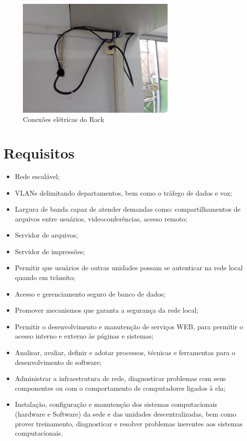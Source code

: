 \documentclass[	DIV=calc,%
							paper=a4,%
							fontsize=12pt,%
							onecolumn]{scrartcl}	 					%
\begin{document}
\begin{figure}[h!]
	\centering
	\includegraphics[width=0.7\textwidth]{figura13.jpg}
	\caption[Conexões elétricas do Rack]{Conexões elétricas do Rack}
	\label{figura13}
\end{figure}
\clearpage

\section{Requisitos}
\begin{itemize}
\item Rede escalável;
\item VLANs delimitando departamentos, bem como o tráfego de dados e voz;
\item Largura de banda capaz de atender demandas como: compartilhamentos de arquivos entre usuários, videoconferências, acesso remoto;
\item Servidor de arquivos;
\item Servidor de impressões;
\item Permitir que usuários de outras unidades possam se autenticar na rede local quando em trânsito;
\item Acesso e gerenciamento seguro de banco de dados;
\item Promover mecanismos que garanta a segurança da rede local;
\item Permitir o desenvolvimento e manutenção de serviços WEB, para permitir o acesso interno e externo às páginas e sistemas;
\item Analisar, avaliar, definir e adotar processos, técnicas e ferramentas para o desenvolvimento de software;
\item Administrar a infraestrutura de rede, diagnosticar problemas com seus componentes ou com o comportamento de computadores ligados à ela;
\item Instalação, configuração e manutenção dos sistemas computacionais (hardware e Software) da sede e das unidades descentralizadas, bem como prover treinamento, diagnosticar e resolver problemas inerentes aos sistemas computacionais.
\end{itemize}
\end{document}
